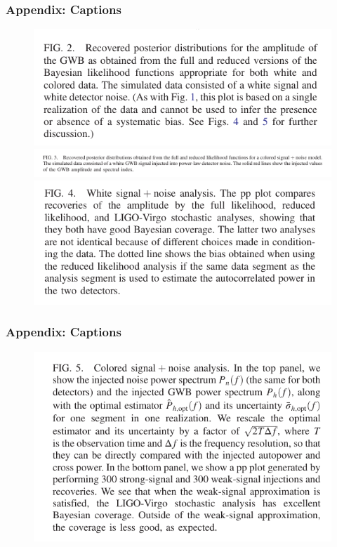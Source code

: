 \documentclass[10pt]{beamer}
\begin{document}
\begin{frame}
  \frametitle{Appendix: Captions}
  \begin{figure}
    \centering
    \includegraphics[scale=.3]{fig2txt.png}
    \includegraphics[scale=.28]{fig3txt.png}
    \includegraphics[scale=.3]{fig4txt.png}
  \end{figure}
\end{frame}

\begin{frame}
  \frametitle{Appendix: Captions}
  \begin{figure}
    \centering
    \includegraphics[scale=.3]{fig5txt.png}

  \end{figure}
\end{frame}
\end{document}
